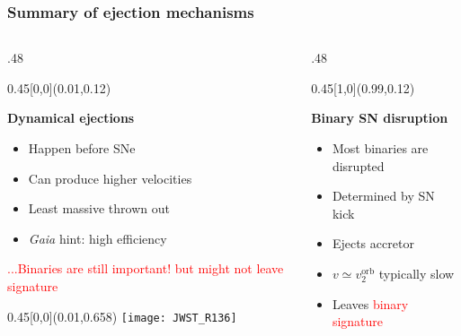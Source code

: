 \documentclass[xcolor=dvipsnames,professionalfonts, aspectratio=169]{beamer}
\begin{document}
\begin{frame}
  \frametitle{Summary of ejection mechanisms}
   \begin{columns}
      \begin{column}{.48\textwidth}
      \begin{textblock}{0.45}[0,0](0.01,0.12)
        \begin{block}{\centering \bf Dynamical ejections}
          \begin{itemize}
          \item Happen before SNe
          \item Can produce higher velocities %
          \item Least massive thrown out
          \item \emph{Gaia} hint: high efficiency
          \end{itemize}
          \textcolor{red}{\small ...Binaries are still important!}
          \textcolor{red}{\small but might not leave signature}
          \begin{center}
            \begin{textblock}{0.45}[0,0](0.01,0.658)
              \texttt{[image: JWST\_R136]}\\
            \end{textblock}
            \end{center}
        \end{block}
      \end{textblock}
    \end{column}
    \begin{column}{.48\textwidth}
       \begin{textblock}{0.45}[1,0](0.99,0.12)
         \begin{block}{\centering \bf Binary SN disruption}
           \begin{itemize}
           \item Most binaries are disrupted
           \item Determined by SN kick
           \item Ejects accretor
           \item $v \simeq v_2^\mathrm{orb}$ typically slow
           \item Leaves \textcolor{red}{binary signature} \\[3pt]

\end{itemize}
\end{block}
\end{textblock}
\end{column}
\end{columns}
\end{frame}
\end{document}
